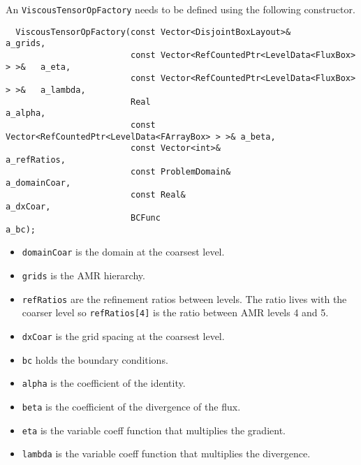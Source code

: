 An {\tt ViscousTensorOpFactory} needs to be defined using the following 
constructor.
\begin{verbatim}
  ViscousTensorOpFactory(const Vector<DisjointBoxLayout>&                     a_grids,
                         const Vector<RefCountedPtr<LevelData<FluxBox> > >&   a_eta,
                         const Vector<RefCountedPtr<LevelData<FluxBox> > >&   a_lambda,
                         Real                                                 a_alpha, 
                         const Vector<RefCountedPtr<LevelData<FArrayBox> > >& a_beta,
                         const Vector<int>&                                   a_refRatios,
                         const ProblemDomain&                                 a_domainCoar,
                         const Real&                                          a_dxCoar,
                         BCFunc                                               a_bc);
\end{verbatim}
\begin{itemize}
  \item  {\tt  domainCoar} is the domain at the coarsest level.
  \item  {\tt  grids} is the AMR  hierarchy.
  \item  {\tt  refRatios} are the refinement ratios between levels.
    The ratio lives with the coarser level    so {\tt refRatios[4]} is
    the ratio between  AMR levels 4 and 5.
  \item  {\tt  dxCoar} is the grid spacing at the coarsest level.
  \item {\tt bc} holds the boundary conditions.
  \item {\tt alpha} is the coefficient of the identity.
  \item {\tt beta} is the coefficient of the divergence of the flux.
  \item {\tt eta} is the variable coeff function that multiplies the gradient. 
  \item {\tt lambda} is the variable coeff function that multiplies the divergence. 
\end{itemize}
  

